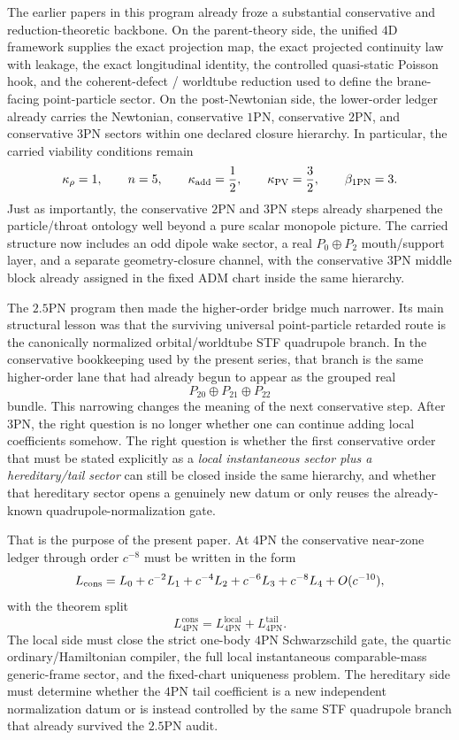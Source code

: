 \documentclass[11pt]{article}
\begin{document}
The earlier papers in this program already froze a substantial conservative and
reduction-theoretic backbone.  On the parent-theory side, the unified $4$D
framework supplies the exact projection map, the exact projected continuity law
with leakage, the exact longitudinal identity, the controlled quasi-static
Poisson hook, and the coherent-defect / worldtube reduction used to define the
brane-facing point-particle sector.  On the post-Newtonian side, the lower-order
ledger already carries the Newtonian, conservative $1$PN, conservative $2$PN,
and conservative $3$PN sectors within one declared closure hierarchy.  In
particular, the carried viability conditions remain
\[
\kappa_\rho = 1,
\qquad
n = 5,
\qquad
\kappa_{\rm add} = \frac{1}{2},
\qquad
\kappa_{\rm PV} = \frac{3}{2},
\qquad
\beta_{\rm 1PN} = 3.
\]
Just as importantly, the conservative $2$PN and $3$PN steps already sharpened
the particle/throat ontology well beyond a pure scalar monopole picture.  The
carried structure now includes an odd dipole wake sector, a real
$P_0\oplus P_2$ mouth/support layer, and a separate geometry-closure channel,
with the conservative $3$PN middle block already assigned in the fixed ADM chart
inside the same hierarchy.

The $2.5$PN program then made the higher-order bridge much narrower.  Its main
structural lesson was that the surviving universal point-particle retarded route
is the canonically normalized orbital/worldtube STF quadrupole branch.  In the
conservative bookkeeping used by the present series, that branch is the same
higher-order lane that had already begun to appear as the grouped real
\[
P_{20}\oplus P_{21}\oplus P_{22}
\]
bundle.  This narrowing changes the meaning of the next conservative step.
After $3$PN, the right question is no longer whether one can continue adding
local coefficients somehow.  The right question is whether the first
conservative order that must be stated explicitly as a \emph{local instantaneous
sector plus a hereditary/tail sector} can still be closed inside the same
hierarchy, and whether that hereditary sector opens a genuinely new datum or
only reuses the already-known quadrupole-normalization gate.

That is the purpose of the present paper.  At $4$PN the conservative near-zone
ledger through order $c^{-8}$ must be written in the form
\[
L_{\rm cons}
=
L_0+c^{-2}L_1+c^{-4}L_2+c^{-6}L_3+c^{-8}L_4+O(c^{-10}),
\]
with the theorem split
\[
L_{4\mathrm{PN}}^{\mathrm{cons}}
=
L_{4\mathrm{PN}}^{\mathrm{local}}
+
L_{4\mathrm{PN}}^{\mathrm{tail}}.
\]
The local side must close the strict one-body $4$PN Schwarzschild gate, the
quartic ordinary/Hamiltonian compiler, the full local instantaneous comparable-mass
generic-frame sector, and the fixed-chart uniqueness problem.  The hereditary
side must determine whether the $4$PN tail coefficient is a new independent
normalization datum or is instead controlled by the same STF quadrupole branch
that already survived the $2.5$PN audit.
\end{document}

